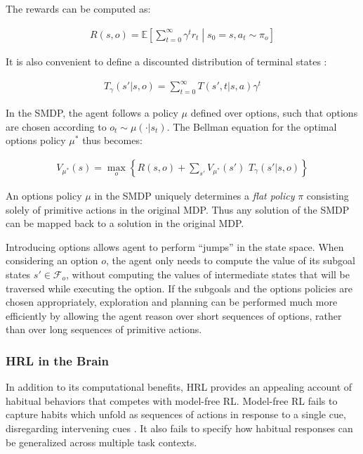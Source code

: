 \documentclass[11pt]{article}
\begin{document}
The rewards can be computed as:

\begin{align*}
R(s,o) = \mathbb{E} \left[ \sum_{t=0}^\infty \gamma^t r_t \middle| s_0 = s, a_t \sim \pi_o \right]
\end{align*}

It is also convenient to define a discounted distribution of terminal states \cite{Sutton1999}:

\begin{align*}
T_\gamma(s'|s,o) = \sum_{t=0}^\infty T(s',t|s,a) \gamma^t
\end{align*}

In the SMDP, the agent follows a policy $\mu$ defined over options, such that options are chosen according to $o_t \sim \mu(\cdot|s_t)$. The Bellman equation for the optimal options policy $\mu^*$ thus becomes:

\begin{align*}
V_{\mu^*}(s) = \max_o  \left\{ R(s,o) + \sum_{s'} V_{\mu^*}(s') \,\, T_\gamma(s'|s,o) \right\} 
\end{align*}

An options policy $\mu$ in the SMDP uniquely determines a \textit{flat policy} $\pi$ consisting solely of primitive actions in the original MDP. Thus any solution of the SMDP can be mapped back to a solution in the original MDP.

Introducing options allows agent to perform ``jumps'' in the state space. When considering an option $o$, the agent only needs to compute the value of its subgoal states $s' \in \mathcal{F}_o$, without computing the values of intermediate states that will be traversed while executing the option. If the subgoals and the options policies are chosen appropriately, exploration and planning can be performed much more efficiently by allowing the agent reason over short sequences of options, rather than over long sequences of primitive actions.

\subsubsection{HRL in the Brain}

In addition to its computational benefits, HRL provides an appealing account of habitual behaviors \cite{Botvinick2008} that competes with model-free RL. Model-free RL fails to capture habits which unfold as sequences of actions in response to a single cue, disregarding intervening cues \cite{Dezfouli2013}. It also fails to specify how habitual responses can be generalized across multiple task contexts.
\end{document}
